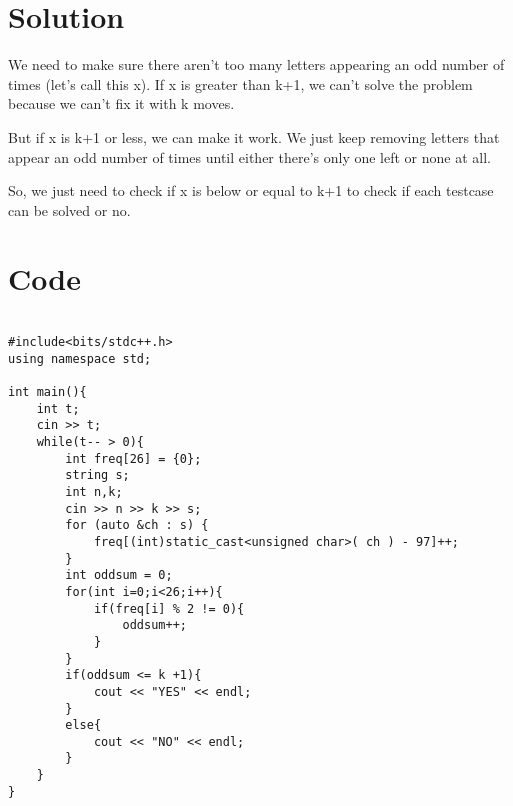 \documentclass{article}
\begin{document}
\section{Solution}

We need to make sure there aren't too many letters appearing an odd number of times (let's call this x). If x is greater than k+1, we can't solve the problem because we can't fix it with k moves.

But if x is k+1 or less, we can make it work. We just keep removing letters that appear an odd number of times until either there's only one left or none at all.

So, we just need to check if x is below or equal to k+1 to check if each testcase can be solved or no.


\newpage
\section{Code}

\begin{lstlisting}

#include<bits/stdc++.h>
using namespace std;

int main(){
    int t;
    cin >> t;
    while(t-- > 0){
        int freq[26] = {0};
        string s;
        int n,k;
        cin >> n >> k >> s;
        for (auto &ch : s) { 
            freq[(int)static_cast<unsigned char>( ch ) - 97]++;
        } 
        int oddsum = 0;
        for(int i=0;i<26;i++){
            if(freq[i] % 2 != 0){
                oddsum++;
            }   
        }
        if(oddsum <= k +1){
            cout << "YES" << endl;
        }
        else{
            cout << "NO" << endl;
        }
    }
}

\end{lstlisting}
\end{document}
